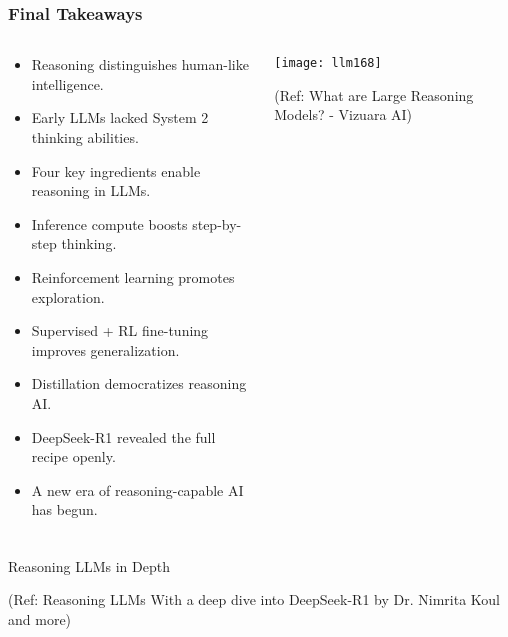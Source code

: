 \begin{frame}[fragile]\frametitle{Final Takeaways}

\begin{columns}
    \begin{column}[T]{0.5\linewidth}
		\begin{itemize}
		  \item Reasoning distinguishes human-like intelligence.
		  \item Early LLMs lacked System 2 thinking abilities.
		  \item Four key ingredients enable reasoning in LLMs.
		  \item Inference compute boosts step-by-step thinking.
		  \item Reinforcement learning promotes exploration.
		  \item Supervised + RL fine-tuning improves generalization.
		  \item Distillation democratizes reasoning AI.
		  \item DeepSeek-R1 revealed the full recipe openly.
		  \item A new era of reasoning-capable AI has begun.
		\end{itemize}

    \end{column}
    \begin{column}[T]{0.5\linewidth}
		\begin{center}
		\texttt{[image: llm168]}
		
		{\tiny (Ref: What are Large Reasoning Models? - Vizuara AI)}
		
		\end{center}
    \end{column}
  \end{columns}
  
\end{frame}





















\begin{frame}[fragile]\frametitle{}
\begin{center}
{\Large Reasoning LLMs in Depth}

{\tiny (Ref: Reasoning LLMs With a deep dive into DeepSeek-R1 by Dr. Nimrita Koul and more)}

\end{center}


\end{frame}


